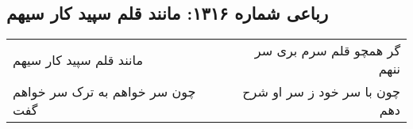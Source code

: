 \begin{center}
\section*{رباعی شماره ۱۳۱۶: مانند قلم سپید کار سیهم}
\label{sec:1316}
\begin{longtable}{l p{0.5cm} r}
مانند قلم سپید کار سیهم
&&
گر همچو قلم سرم بری سر ننهم
\\
چون سر خواهم به ترک سر خواهم گفت
&&
چون با سر خود ز سر او شرح دهم
\\
\end{longtable}
\end{center}

